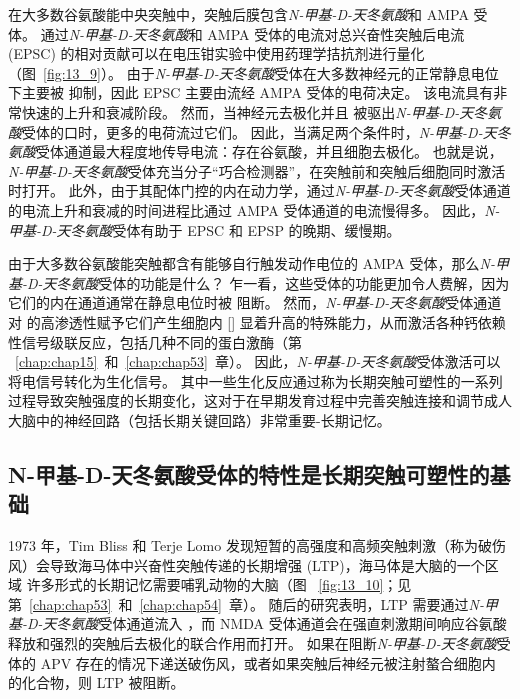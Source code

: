 在大多数谷氨酸能中央突触中，突触后膜包含\textit{N-甲基-D-天冬氨酸}和 AMPA 受体。
通过\textit{N-甲基-D-天冬氨酸}和 AMPA 受体的电流对总兴奋性突触后电流 (EPSC) 的相对贡献可以在电压钳实验中使用药理学拮抗剂进行量化（图~\ref{fig:13_9}）。
由于\textit{N-甲基-D-天冬氨酸}受体在大多数神经元的正常静息电位下主要被  抑制，因此 EPSC 主要由流经 AMPA 受体的电荷决定。
该电流具有非常快速的上升和衰减阶段。
然而，当神经元去极化并且  被驱出\textit{N-甲基-D-天冬氨酸}受体的口时，更多的电荷流过它们。
因此，当满足两个条件时，\textit{N-甲基-D-天冬氨酸}受体通道最大程度地传导电流：存在谷氨酸，并且细胞去极化。
也就是说，\textit{N-甲基-D-天冬氨酸}受体充当分子“巧合检测器”，在突触前和突触后细胞同时激活时打开。
此外，由于其配体门控的内在动力学，通过\textit{N-甲基-D-天冬氨酸}受体通道的电流上升和衰减的时间进程比通过 AMPA 受体通道的电流慢得多。
因此，\textit{N-甲基-D-天冬氨酸}受体有助于 EPSC 和 EPSP 的晚期、缓慢期。


由于大多数谷氨酸能突触都含有能够自行触发动作电位的 AMPA 受体，那么\textit{N-甲基-D-天冬氨酸}受体的功能是什么？
乍一看，这些受体的功能更加令人费解，因为它们的内在通道通常在静息电位时被  阻断。
然而，\textit{N-甲基-D-天冬氨酸}受体通道对  的高渗透性赋予它们产生细胞内 [] 显着升高的特殊能力，从而激活各种钙依赖性信号级联反应，包括几种不同的蛋白激酶（第 ~\ref{chap:chap15}~和~\ref{chap:chap53}~章）。
因此，\textit{N-甲基-D-天冬氨酸}受体激活可以将电信号转化为生化信号。
其中一些生化反应通过称为长期突触可塑性的一系列过程导致突触强度的长期变化，这对于在早期发育过程中完善突触连接和调节成人大脑中的神经回路（包括长期关键回路）非常重要-长期记忆。



\subsection{N-甲基-D-天冬氨酸受体的特性是长期突触可塑性的基础}

1973 年，Tim Bliss 和 Terje Lomo 发现短暂的高强度和高频突触刺激（称为破伤风）会导致海马体中兴奋性突触传递的长期增强 (LTP)，海马体是大脑的一个区域 许多形式的长期记忆需要哺乳动物的大脑（图 ~\ref{fig:13_10}；见第~\ref{chap:chap53}~和~\ref{chap:chap54}~章）。
随后的研究表明，LTP 需要通过\textit{N-甲基-D-天冬氨酸}受体通道流入 ，而 NMDA 受体通道会在强直刺激期间响应谷氨酸释放和强烈的突触后去极化的联合作用而打开。
如果在阻断\textit{N-甲基-D-天冬氨酸}受体的 APV 存在的情况下递送破伤风，或者如果突触后神经元被注射螯合细胞内  的化合物，则 LTP 被阻断。


